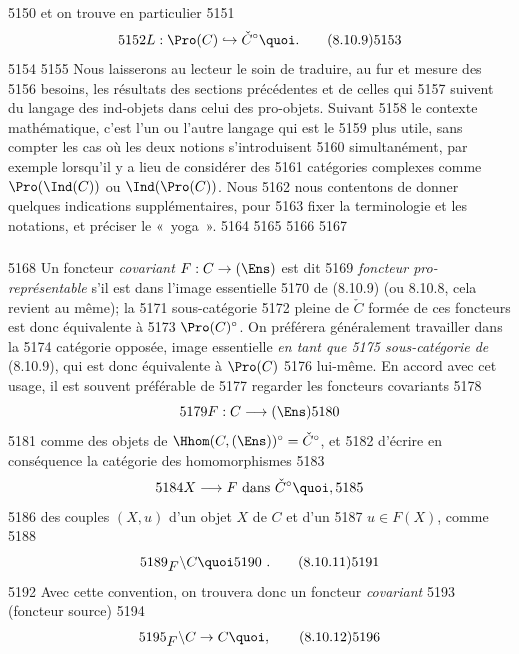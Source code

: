   5150	et on trouve en particulier
  5151	\begin{equation}
  5152	L:\Pro(C)\hookrightarrow \check{C}^\circ{\quoi}.\tag{8.10.9}
  5153	\end{equation}
  5154	
  5155	Nous laisserons au lecteur le soin de traduire, au fur et mesure des
  5156	besoins, les résultats des sections précédentes et de celles qui
  5157	suivent du langage des ind-objets dans celui des pro-objets. Suivant
  5158	le contexte mathématique, c'est l'un ou l'autre langage qui est le
  5159	plus utile, sans compter les cas où les deux notions s'introduisent
  5160	simultanément, par exemple lorsqu'il y a lieu de considérer des
  5161	catégories complexes comme $\Pro(\Ind(C))$ ou $\Ind(\Pro(C))$. Nous
  5162	nous contentons de donner quelques indications supplémentaires, pour
  5163	fixer la terminologie et les notations, et préciser le « yoga ».
  5164	
  5165	
  5166	\setcounter{subsubsection}{9}
  5167	\subsubsection{}
  5168	Un foncteur \emph{covariant $F:C\rightarrow (\Ens)$} est dit
  5169	\emph{foncteur pro-représentable} s'il est dans l'image essentielle
  5170	de (8.10.9) (ou 8.10.8, cela revient au même); la
  5171	sous-catégorie
  5172	pleine de $\check{C}$ formée de ces foncteurs est donc équivalente à
  5173	$\Pro(C)^\circ$. On préférera généralement travailler dans la
  5174	catégorie opposée, image essentielle \emph{en tant que
  5175	sous-catégorie de} (8.10.9), qui est donc équivalente à $\Pro(C)$
  5176	lui-même. En accord avec cet usage, il est souvent préférable de
  5177	regarder les foncteurs covariants
  5178	$$
  5179	F:C\longrightarrow (\Ens)
  5180	$$
  5181	comme des objets de $\Hhom(C,(\Ens))^\circ=\check{C}^\circ$, et
  5182	d'écrire en conséquence la catégorie des homomorphismes
  5183	$$
  5184	X\longrightarrow F\mbox{ dans } \check{C}^\circ{\quoi},
  5185	$$
  5186	\ie\pageoriginale des couples $(X,u)$ d'un objet $X$ de $C$ et d'un
  5187	$u\in F(X)$, comme
  5188	\begin{equation}
  5189	{}_{\displaystyle F}\backslash C{\quoi}  %
  5190	\ .\tag{8.10.11}
  5191	\end{equation}
  5192	Avec cette convention, on trouvera donc un foncteur \emph{covariant}
  5193	(foncteur source)
  5194	\begin{equation}
  5195	{}_{\displaystyle F}\backslash C\rightarrow C{\quoi},\tag{8.10.12}
  5196	\end{equation}

